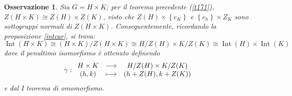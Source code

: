 \documentclass[12pt]{scrartcl}
\theoremstyle{style}
\newtheorem{osservazione}{Osservazione}[section]
\numberwithin{equation}{subsection}
\begin{document}
\begin{osservazione}
	Sia $G = H \times K$; per il teorema precedente (\ref{t171}), $Z(H \times  K) \cong Z(H) \times Z(K)$, visto che $Z(H) \times \left\{ e_K \right\} $ e $\left\{ e_h \right\} \times Z_K$ sono sottogruppi normali di $Z(H\times K)$.
	Conseguentemente, ricordando la proposizione \ref{intcar}, si trova:
	\[
	\operatorname{Int} (H \times K) \cong (H\times K )/ Z(H\times K)\cong H / Z(H) \times K / Z(K)\cong \operatorname{Int} (H) \times \operatorname{Int} (K)
	\] 
	dove il penultimo isomorfismo \`e ottenuto definendo
	\[
	\gamma :
	\begin{array}
		{c c c}
		H \times K & \longrightarrow &H / Z(H) \times K / Z(K)\\
		(h,k) & \longmapsto & \left(h + Z(H) , k + Z(K)\right) 
	\end{array}
	\] 
	e dal I teorema di omomorfismo.
\end{osservazione}
\end{document}
